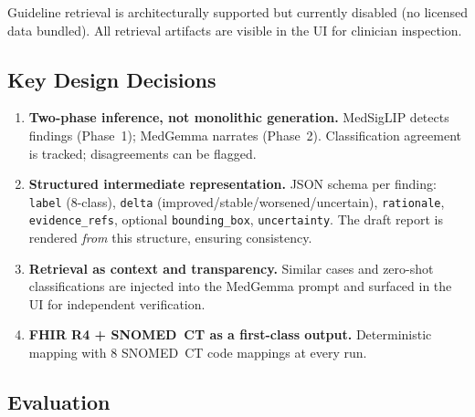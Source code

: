 \documentclass[10pt,twocolumn]{article}
\begin{document}
\noindent Guideline retrieval is architecturally supported but currently disabled (no licensed data bundled).
All retrieval artifacts are visible in the UI for clinician inspection.

\subsection{Key Design Decisions}

\begin{enumerate}
  \item \textbf{Two-phase inference, not monolithic generation.}
  MedSigLIP detects findings (Phase~1); MedGemma narrates (Phase~2).
  Classification agreement is tracked; disagreements can be flagged.

  \item \textbf{Structured intermediate representation.}
  JSON schema per finding: \texttt{label} (8-class), \texttt{delta} (improved/stable/worsened/uncertain), \texttt{rationale}, \texttt{evidence\_refs}, optional \texttt{bounding\_box}, \texttt{uncertainty}.
  The draft report is rendered \emph{from} this structure, ensuring consistency.

  \item \textbf{Retrieval as context and transparency.}
  Similar cases and zero-shot classifications are injected into the MedGemma prompt and surfaced in the UI for independent verification.

  \item \textbf{FHIR R4 + SNOMED~CT as a first-class output.}
  Deterministic mapping with 8 SNOMED~CT code mappings at every run.
\end{enumerate}

\subsection{Evaluation}
\end{document}

